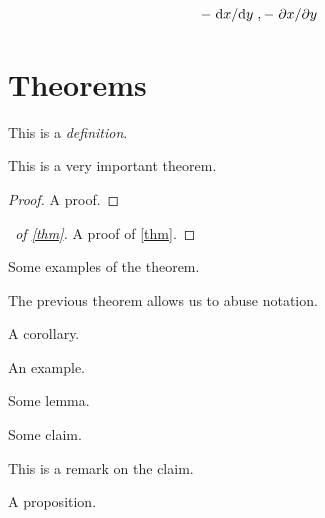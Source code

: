 \documentclass{article}
\begin{document}
\[
    -\dv*{x}{y}, -\pdv*{x}{y}
\]

\section{Theorems}
\begin{definition}
    \label{def}%
    This is a \emph{definition}. \lipsum[1]
\end{definition}

\begin{theorem}
    \label{thm}%
    This is a very important theorem. \lipsum[2]
\end{theorem}

\begin{proof}
    A proof. \lipsum[3]
\end{proof}

\begin{proof}[\proofname\ of \autoref{thm}]
    A proof of \autoref{thm}. \lipsum[4]
\end{proof}

\begin{examples}
    Some examples of the theorem. \lipsum[5]
\end{examples}

\begin{notation}
    The previous theorem allows us to abuse notation. \lipsum[6]
\end{notation}

\begin{corollary}
    \label{cor}%
    A corollary. \lipsum[7]
\end{corollary}

\begin{example}[An example]
    An example. \lipsum[8]
\end{example}

\begin{lemma}
    \label{lem}%
    Some lemma. \lipsum[9]
\end{lemma}

\begin{claim}
    \label{cla}%
    Some claim. \lipsum[10]
\end{claim}

\begin{remark}
    This is a remark on the claim. \lipsum[11]
\end{remark}

\begin{proposition}
    \label{pro}%
    A proposition. \lipsum[12]
\end{proposition}
\end{document}
